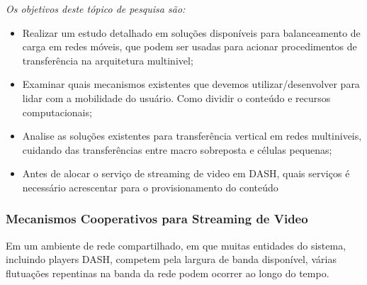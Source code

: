 
\emph{Os objetivos deste tópico de pesquisa são:}
\begin{itemize}

\item Realizar um estudo detalhado em soluções disponíveis para balanceamento de carga em redes móveis, que podem ser usadas para acionar procedimentos de transferência na arquitetura multinivel;

\item Examinar quais mecanismos existentes que devemos utilizar/desenvolver para lidar com a mobilidade do usuário.
Como dividir o conteúdo e recursos computacionais;

\item Analise as soluções existentes para transferência vertical em redes multiniveis, cuidando das transferências entre macro sobreposta e células pequenas;

\item Antes de alocar o serviço de streaming de video em DASH, quais serviços é necessário
acrescentar para o provisionamento do conteúdo

\end{itemize}


\subsubsection{Mecanismos Cooperativos para Streaming de Video}
\label{subsec:video-streaming}


Em um ambiente de rede compartilhado, em que muitas entidades do sistema, incluindo players DASH, competem pela largura de banda disponível, várias flutuações repentinas na banda da rede podem ocorrer ao longo do tempo.

